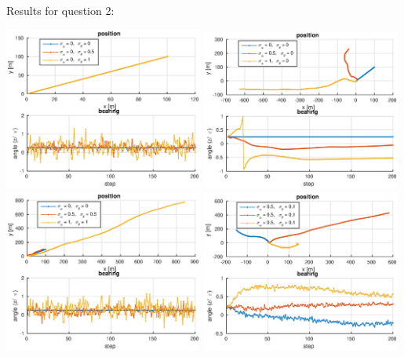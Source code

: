 \documentclass[english,DIV=13]{scrartcl}
\begin{document}
Results for question 2:
\begin{center}
   \includegraphics[width=0.49\textwidth]{img/q2_1.eps}
   \includegraphics[width=0.49\textwidth]{img/q2_2.eps}
   \includegraphics[width=0.49\textwidth]{img/q2_3.eps}
   \includegraphics[width=0.49\textwidth]{img/q2_4.eps}
\end{center}
\end{document}
